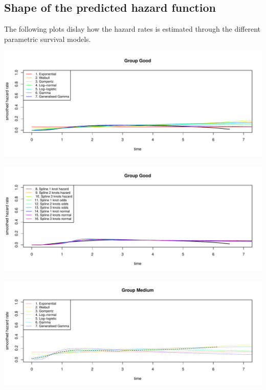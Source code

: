 \documentclass[]{article}
\begin{document}
\newpage

\subsection{Shape of the predicted hazard
function}\label{shape-of-the-predicted-hazard-function}

The following plots dislay how the hazard rates is estimated through the
different parametric survival models.

\begin{flushleft}\includegraphics[height=0.29\textheight]{Images/plot_haz_pred-1} \end{flushleft}

\begin{flushleft}\includegraphics[height=0.29\textheight]{Images/plot_haz_pred-2} \end{flushleft}

\begin{flushleft}\includegraphics[height=0.29\textheight]{Images/plot_haz_pred-3} \end{flushleft}
\end{document}
